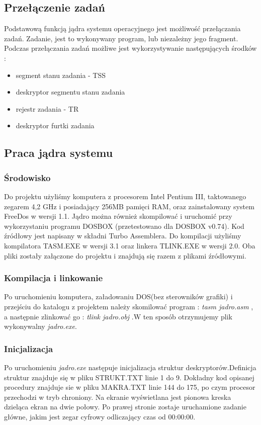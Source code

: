 \documentclass[a4paper,12pt]{article}
\begin{document}
	\subsection{Przełączenie zadań}
			Podstawową funkcją jądra systemu operacyjnego jest możliwość przełączania zadań. Zadanie, jest to wykonywany program, lub niezależny jego fragment. Podczas przełączania zadań możliwe jest wykorzystywanie następujących środków :
		\begin{itemize}
			\item{segment stanu zadania - TSS}
			\item{deskryptor segmentu stanu zadania}
			\item{rejestr zadania - TR}
			\item{deskryptor furtki zadania}
		\end{itemize}
	\subsection{Praca jądra systemu}
		\subsubsection{Środowisko}
			Do projektu użyliśmy komputera z procesorem Intel Pentium III, taktowanego zegarem 4,2 GHz i posiadający 256MB pamięci RAM, oraz zainstalowany system FreeDos w wersji 1.1. Jądro można również skompilować i uruchomić przy wykorzystaniu programu DOSBOX (przetestowano dla DOSBOX v0.74). Kod źródłowy jest napisany w składni Turbo Assemblera. Do kompilacji użyliśmy kompilatora TASM.EXE w wersji 3.1 oraz linkera TLINK.EXE w wersji 2.0. Oba pliki zostały załączone do projektu i znajdują się razem z plikami źródłowymi.
		\subsubsection{Kompilacja i linkowanie}
			 Po uruchomieniu komputera, załadowaniu DOS(bez sterowników grafiki) i przejściu do katalogu z projektem należy skomilować program : \textit{tasm jadro.asm} , a następnie zlinkować go :  \textit{tlink jadro.obj} .W ten sposób otrzymujemy plik wykonywalny \textit{jadro.exe}. 
		\subsubsection{Inicjalizacja} 	
			Po  uruchomieniu \textit{jadro.exe} następuje inicjalizacja struktur deskryptorów.Definicja struktur znajduje się w pliku STRUKT.TXT linie 1 do 9. Dokładny kod opisanej procedury znajduje sie w pliku MAKRA.TXT linie 144 do 175, po czym procesor przechodzi w tryb chroniony. Na ekranie wyświetlana jest pionowa kreska dzieląca ekran na dwie połowy. Po prawej stronie zostaje uruchamione zadanie główne, jakim jest zegar cyfrowy odliczający czas od 00:00:00.
\end{document}
